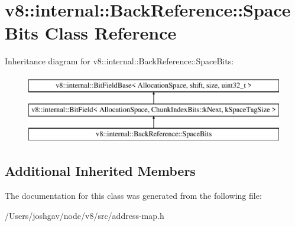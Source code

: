 \hypertarget{classv8_1_1internal_1_1_back_reference_1_1_space_bits}{}\section{v8\+:\+:internal\+:\+:Back\+Reference\+:\+:Space\+Bits Class Reference}
\label{classv8_1_1internal_1_1_back_reference_1_1_space_bits}
Inheritance diagram for v8\+:\+:internal\+:\+:Back\+Reference\+:\+:Space\+Bits\+:\begin{figure}[H]
\begin{center}
\leavevmode
\includegraphics[height=3.000000cm]{classv8_1_1internal_1_1_back_reference_1_1_space_bits}
\end{center}
\end{figure}
\subsection*{Additional Inherited Members}


The documentation for this class was generated from the following file\+:\begin{DoxyCompactItemize}
\item 
/\+Users/joshgav/node/v8/src/address-\/map.\+h\end{DoxyCompactItemize}
